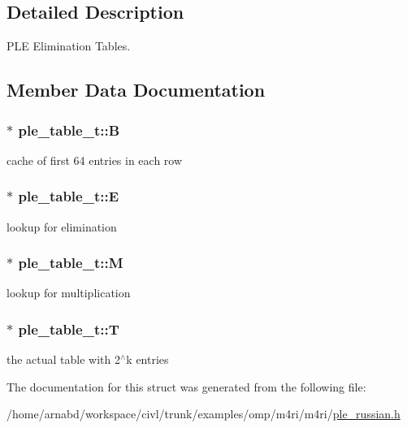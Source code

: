 \subsection{Detailed Description}
P\+L\+E Elimination Tables. 

\subsection{Member Data Documentation}
\hypertarget{structple__table__t_a97a0cf126ad6f93e15b59233f8e60604}{}
\subsubsection[{B}]{$\ast$ ple\+\_\+table\+\_\+t\+::\+B}\label{structple__table__t_a97a0cf126ad6f93e15b59233f8e60604}
cache of first 64 entries in each row \hypertarget{structple__table__t_a5e6734cb14c95bf9eead28ce33a44d73}{}
\subsubsection[{E}]{$\ast$ ple\+\_\+table\+\_\+t\+::\+E}\label{structple__table__t_a5e6734cb14c95bf9eead28ce33a44d73}
lookup for elimination \hypertarget{structple__table__t_aa881f8cb4df5b51730030f1fe1aef595}{}
\subsubsection[{M}]{$\ast$ ple\+\_\+table\+\_\+t\+::\+M}\label{structple__table__t_aa881f8cb4df5b51730030f1fe1aef595}
lookup for multiplication \hypertarget{structple__table__t_a225464f42780520a354003a52d5f05eb}{}
\subsubsection[{T}]{$\ast$ ple\+\_\+table\+\_\+t\+::\+T}\label{structple__table__t_a225464f42780520a354003a52d5f05eb}
the actual table with 2$^\wedge$k entries 

The documentation for this struct was generated from the following file\+:\begin{DoxyCompactItemize}
\item 
/home/arnabd/workspace/civl/trunk/examples/omp/m4ri/m4ri/\hyperlink{ple__russian_8h}{ple\+\_\+russian.\+h}\end{DoxyCompactItemize}
